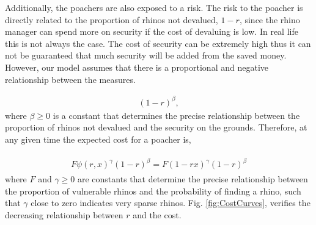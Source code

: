 \documentclass[10pt]{article}
\begin{document}
Additionally, the poachers are also exposed to a risk. The risk to the poacher is
directly related to the proportion of rhinos not devalued, \(1 - r\), since
the rhino manager can spend more on security if the cost of devaluing is low.
In real life this is not always the case. The cost of security can be extremely
high thus it can not be guaranteed that much security will be added from the
saved money. However, our model assumes that there is a proportional and negative
relationship between the measures.

\begin{eqnarray}
    \label{eqn:risk}
    (1 - r)^{\beta},
\end{eqnarray}
where \(\beta \geq 0\) is a constant that determines the precise relationship between
the proportion of rhinos not devalued and the security on the grounds. Therefore,
at any given time the expected cost for a poacher is, 

\begin{eqnarray}
    \label{eqn:individual_cost}
    \begin{array}{l}
    F \psi(r, x)^{\gamma} (1 - r)^{\beta} = F (1 - rx) ^{\gamma} (1 - r) ^{\beta}
    \end{array}
\end{eqnarray}
where \(F\) and \(\gamma \geq 0\) are constants that determine the precise relationship
between the proportion of vulnerable rhinos and the probability of finding a rhino,
such that \(\gamma\) close to zero indicates very sparse rhinos. Fig.
\ref{fig:CostCurves},  verifies the decreasing relationship between \(r\) and the
cost.
\end{document}
